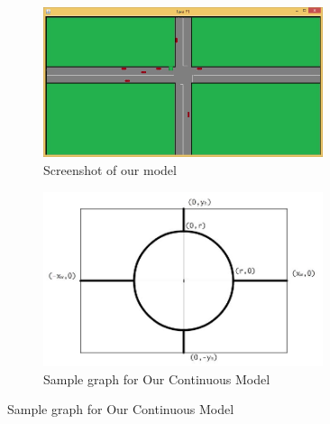 \documentclass[11pt]{article}
\begin{document}
\begin{figure}
	
	\centering
	\begin{subfigure}{.45\textwidth}
		\centering
		\includegraphics[width=0.9\textwidth]{ScreenShotNurSim}
		\caption{Screenshot of  our model }
		\label{NurScreenshot}
	\end{subfigure}
	\begin{subfigure}{.45\textwidth}
		\centering
		\includegraphics[width=0.9\textwidth]{KimsModel}
		\caption{Sample graph for Our Continuous Model}
		\label{KimModel}
	\end{subfigure}
\end{figure}	
%		
\end{document}
